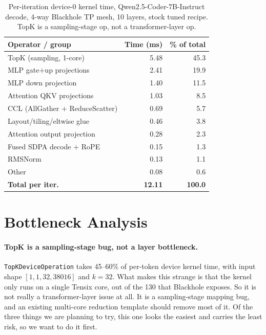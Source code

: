 \documentclass[sigplan,nonacm,review]{acmart}
\begin{document}
\begin{table}[t]
\centering
\small
\caption{Per-iteration device-0 kernel time, Qwen2.5-Coder-7B-Instruct
  decode, 4-way Blackhole TP mesh, 10 layers, stock tuned recipe.
  TopK is a sampling-stage op, not a transformer-layer op.}
\label{tab:baseline}
\begin{tabular}{lrr}
\toprule
Operator / group & Time (ms) & \% of total \\
\midrule
TopK (sampling, 1-core)          & 5.48 & 45.3 \\
MLP gate${+}$up projections      & 2.41 & 19.9 \\
MLP down projection              & 1.40 & 11.5 \\
Attention QKV projections        & 1.03 &  8.5 \\
CCL (AllGather ${+}$ ReduceScatter)& 0.69 &  5.7 \\
Layout/tiling/eltwise glue       & 0.46 &  3.8 \\
Attention output projection      & 0.28 &  2.3 \\
Fused SDPA decode ${+}$ RoPE     & 0.15 &  1.3 \\
RMSNorm                          & 0.13 &  1.1 \\
Other                            & 0.08 &  0.6 \\
\midrule
\textbf{Total per iter.}         & \textbf{12.11} & \textbf{100.0} \\
\bottomrule
\end{tabular}
\end{table}

\section{Bottleneck Analysis}
\paragraph{TopK is a sampling-stage bug, not a layer bottleneck.}
\texttt{TopKDeviceOperation} takes 45--60\% of per-token device kernel
time, with input shape $[1,1,32,38016]$ and $k{=}32$. What makes this
strange is that the kernel only runs on a single Tensix core, out of
the 130 that Blackhole exposes. So it is not really a transformer-layer
issue at all. It is a sampling-stage mapping bug, and an existing
multi-core reduction template should remove most of it. Of the three
things we are planning to try, this one looks the easiest and carries
the least risk, so we want to do it first.
\end{document}

